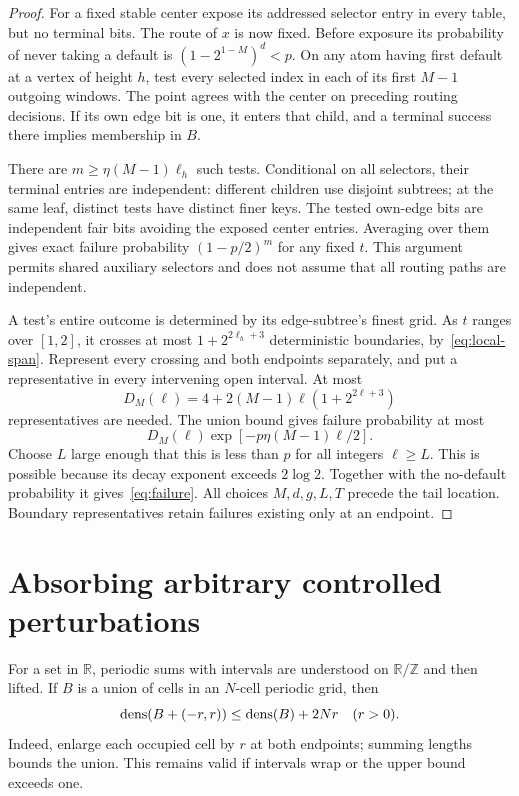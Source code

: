 \documentclass[11pt]{article}
\theoremstyle{remark}\newtheorem{remark}[theorem]{Remark}
\newcommand{\R}{\mathbb R}\newcommand{\N}{\mathbb N}\newcommand{\Z}{\mathbb Z}
\newcommand{\T}{\mathbb R/\mathbb Z}\newcommand{\E}{\mathbb E}
\begin{document}
\begin{proof}
For a fixed stable center expose its addressed selector entry in every table, but no terminal bits. The route of $x$ is now fixed. Before exposure its probability of never taking a default is $(1-2^{1-M})^d<p$. On any atom having first default at a vertex of height $h$, test every selected index in each of its first $M-1$ outgoing windows. The point agrees with the center on preceding routing decisions. If its own edge bit is one, it enters that child, and a terminal success there implies membership in $B$.

There are $m\ge\eta(M-1)\ell_h$ such tests. Conditional on all selectors, their terminal entries are independent: different children use disjoint subtrees; at the same leaf, distinct tests have distinct finer keys. The tested own-edge bits are independent fair bits avoiding the exposed center entries. Averaging over them gives exact failure probability $(1-p/2)^m$ for any fixed $t$. This argument permits shared auxiliary selectors and does not assume that all routing paths are independent.

A test's entire outcome is determined by its edge-subtree's finest grid. As $t$ ranges over $[1,2]$, it crosses at most $1+2^{2\ell_h+3}$ deterministic boundaries, by~\eqref{eq:local-span}. Represent every crossing and both endpoints separately, and put a representative in every intervening open interval. At most
\[
 D_M(\ell)=4+2(M-1)\ell(1+2^{2\ell+3})
\]
representatives are needed. The union bound gives failure probability at most
\[
 D_M(\ell)\exp[-p\eta(M-1)\ell/2].
\]
Choose $L$ large enough that this is less than $p$ for all integers $\ell\ge L$. This is possible because its decay exponent exceeds $2\log2$. Together with the no-default probability it gives~\eqref{eq:failure}. All choices $M,d,g,L,T$ precede the tail location. Boundary representatives retain failures existing only at an endpoint.
\end{proof}

\section{Absorbing arbitrary controlled perturbations}\label{sec:robust}
For a set in $\R$, periodic sums with intervals are understood on $\T$ and then lifted. If $B$ is a union of cells in an $N$-cell periodic grid, then
\begin{equation}\label{eq:buffer-measure}
 \operatorname{dens}(B+(-r,r))\le\operatorname{dens}(B)+2Nr\quad(r>0).
\end{equation}
Indeed, enlarge each occupied cell by $r$ at both endpoints; summing lengths bounds the union. This remains valid if intervals wrap or the upper bound exceeds one.
\end{document}
